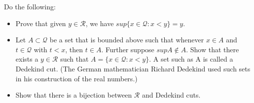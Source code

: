 \documentclass[11 pt]{article}
\begin{document}
\pagebreak
\begin{problem}
	Do the following: 
	\begin{itemize}
		\item Prove that given $y\in\mathcal{R}$, we have $sup\{x\in\mathcal{Q}:x<y\}=y$.
		\item Let $A\subset\mathcal{Q}$ be a set that is bounded above such that whenever $x\in A$ and $t\in \mathcal{Q}$ with $t<x$, then $t\in A$. Further suppose $supA\notin A$. Show that there exists a  $y\in\mathcal{R}$ such that $A=\{x\in\mathcal{Q}:x<y\}$. A set such as A is called a Dedekind cut. (The German mathematician Richard Dedekind used such sets in his construction of the real numbers.)
		\item Show that there is a bijection between $\mathcal{R}$ and Dedekind cuts.
	\end{itemize}
\end{problem}
\end{document}
